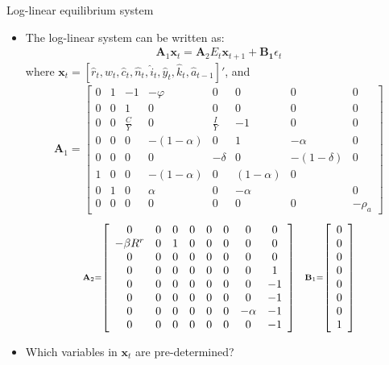 \documentclass[9pt,xcolor={dvipsnames}]{beamer}
\newcommand{\bit}{\begin{itemize}}
\newcommand{\eit}{\end{itemize}}
\begin{document}
\begin{frame}{Log-linear equilibrium system}

\bit
\setlength\itemsep{0.5em}

\item The log-linear system can be written as:
\begin{eqnarray}
\mathbf A_1 \mathbf{x}_{t} = \mathbf A_2 E_t \mathbf x_{t+1} + \mathbf {B_1} \epsilon_t  \nonumber
\end{eqnarray}
where $\mathbf{x}_{t} = [\hat r_t, \hat w_t,\hat c_t,\hat n_t,\hat i_t,\hat y_t,\hat k_{t},\hat a_{t-1}]'$, and
\begin{eqnarray} \scriptstyle
\mathbf A_1 = \left[\begin{array}{cccccccc}
0 & 1 & -1 & - \varphi & 0 & 0 & 0 & 0 \\
0 & 0 & 1 & 0 & 0 & 0 & 0 & 0 \\
0 & 0 & \frac{C}{Y} & 0 & \frac{I}{Y} & -1 & 0 & 0 \\
0 & 0 & 0 & -(1-\alpha) & 0 & 1 & -\alpha & 0 \\
0 & 0 & 0 & 0 & -\delta & 0 & -(1-\delta) & 0 \\
1 & 0 & 0 & -(1-\alpha) & 0 & (1-\alpha) & 0 &  \\
0 & 1 & 0 & \alpha & 0 & -\alpha &  & 0 \\
0 & 0 & 0 & 0 & 0 & 0 & 0 & -\rho_a
\end{array}\right] \nonumber
\end{eqnarray}
\begin{eqnarray} \scriptstyle
\mathbf A_2 = \left[\begin{array}{cccccccc}
0 & 0 & 0 & 0 & 0 & 0 & 0 & 0 \\
- \beta R^r  & 0 & 1 & 0 & 0 & 0 & 0 & 0 \\
0 & 0 & 0 & 0 & 0 & 0 & 0 & 0 \\
0 & 0 & 0 & 0 & 0 & 0 & 0 & 1 \\
0 & 0 & 0 & 0 & 0 & 0 & 0 & -1 \\
0 & 0 & 0 & 0 & 0 & 0 & 0 & -1 \\
0 & 0 & 0 & 0 & 0 & 0 & -\alpha & -1 \\
0 & 0 & 0 & 0 & 0 & 0 & 0 & -1
\end{array}\right]  \hspace{3mm} 
\mathbf B_1 = \left[\begin{array}{cc}
0 \\
0 \\
0 \\
0 \\
0 \\
0 \\
0 \\
1
\end{array}\right] \nonumber
\end{eqnarray}

\item Which variables in $\mathbf{x}_{t}$ are pre-determined?

\eit

\end{frame}
\end{document}
